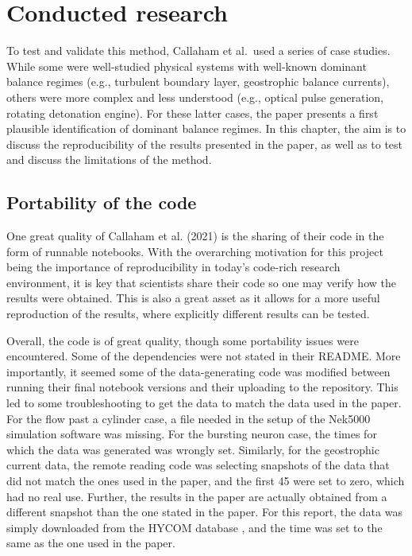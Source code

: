 \documentclass[12pt]{report} %
\begin{document}
\chapter{Conducted research}

To test and validate this method, Callaham et al.\ used a series of case studies\cite{callaham2021learning}. While some were well-studied physical systems with well-known dominant balance regimes (e.g., turbulent boundary layer, geostrophic balance currents), others were more complex and less understood (e.g., optical pulse generation, rotating detonation engine). For these latter cases, the paper presents a first plausible identification of dominant balance regimes. In this chapter, the aim is to discuss the reproducibility of the results presented in the paper, as well as to test and discuss the limitations of the method.

\section{Portability of the code}

One great quality of Callaham et al. (2021)\cite{callaham2021learning} is the sharing of their code in the form of runnable notebooks. With the overarching motivation for this project being the importance of reproducibility in today’s code-rich research environment, it is key that scientists share their code so one may verify how the results were obtained. This is also a great asset as it allows for a more useful reproduction of the results, where explicitly different results can be tested.

Overall, the code is of great quality, though some portability issues were encountered. Some of the dependencies were not stated in their README. More importantly, it seemed some of the data-generating code was modified between running their final notebook versions and their uploading to the repository. This led to some troubleshooting to get the data to match the data used in the paper. For the flow past a cylinder case, a file needed in the setup of the Nek5000 simulation software was missing\cite{nek5000setup}. For the bursting neuron case, the times for which the data was generated was wrongly set. Similarly, for the geostrophic current data, the remote reading code was selecting snapshots of the data that did not match the ones used in the paper, and the first 45 were set to zero, which had no real use. Further, the results in the paper are actually obtained from a different snapshot than the one stated in the paper. For this report, the data was simply downloaded from the HYCOM database \cite{hycom}, and the time was set to the same as the one used in the paper.
\end{document}
